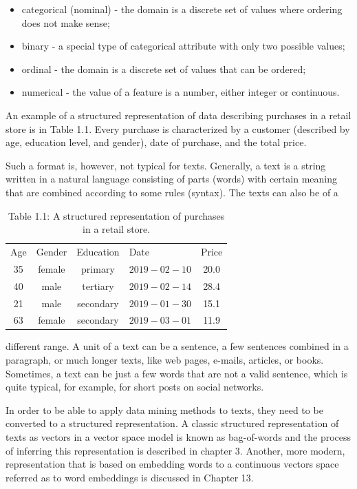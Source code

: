 \documentclass[10pt]{book}
\begin{document}
\begin{itemize}
  \item categorical (nominal) - the domain is a discrete set of values where ordering does not make sense;
  \item binary - a special type of categorical attribute with only two possible values;
  \item ordinal - the domain is a discrete set of values that can be ordered;
  \item numerical - the value of a feature is a number, either integer or continuous.
\end{itemize}

An example of a structured representation of data describing purchases in a retail store is in Table 1.1. Every purchase is characterized by a customer (described by age, education level, and gender), date of purchase, and the total price.

Such a format is, however, not typical for texts. Generally, a text is a string written in a natural language consisting of parts (words) with certain meaning that are combined according to some rules (syntax). The texts can also be of a

\begin{table}[h]
\begin{center}
\captionsetup{labelformat=empty}
\caption{Table 1.1: A structured representation of purchases in a retail store.}
\begin{tabular}{ccclc}
\hline
Age & Gender & Education & Date & Price \\
35 & female & primary & $2019-02-10$ & 20.0 \\
40 & male & tertiary & $2019-02-14$ & 28.4 \\
21 & male & secondary & $2019-01-30$ & 15.1 \\
63 & female & secondary & $2019-03-01$ & 11.9 \\
\hline
\end{tabular}
\end{center}
\end{table}

different range. A unit of a text can be a sentence, a few sentences combined in a paragraph, or much longer texts, like web pages, e-mails, articles, or books. Sometimes, a text can be just a few words that are not a valid sentence, which is quite typical, for example, for short posts on social networks.

In order to be able to apply data mining methods to texts, they need to be converted to a structured representation. A classic structured representation of texts as vectors in a vector space model is known as bag-of-words and the process of inferring this representation is described in chapter 3. Another, more modern, representation that is based on embedding words to a continuous vectors space referred as to word embeddings is discussed in Chapter 13.
\end{document}
